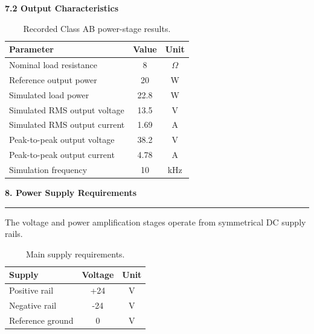 \documentclass[10pt,letterpaper]{article}
\newcommand{\datasheetsection}[1]{
    \vspace{0.3cm}
    {\large\bfseries\color{datasheetblue}#1}
    \par\vspace{0.1cm}
    \hrule
    \vspace{0.15cm}
}
\newcommand{\datasheetsubsection}[1]{
    \vspace{0.15cm}
    {\normalsize\bfseries\color{datasheetblue}#1}
    \par
}
\begin{document}
\datasheetsubsection{7.2 Output Characteristics}

\begin{table}[htbp]
\centering
\small

\begin{tabular}{p{7cm}cc}
\hline
Parameter & Value & Unit\\
\hline

Nominal load resistance & 8 & $\Omega$\\

Reference output power & 20 & W\\

Simulated load power & 22.8 & W\\

Simulated RMS output voltage & 13.5 & V\\

Simulated RMS output current & 1.69 & A\\

Peak-to-peak output voltage & 38.2 & V\\

Peak-to-peak output current & 4.78 & A\\

Simulation frequency & 10 & kHz\\

\hline
\end{tabular}

\caption{Recorded Class AB power-stage results.}
\end{table}

\datasheetsection{8. Power Supply Requirements}

The voltage and power amplification stages
operate from symmetrical DC supply rails.

\begin{table}[htbp]
\centering

\begin{tabular}{p{7cm}cc}
\hline
Supply & Voltage & Unit\\
\hline

Positive rail & +24 & V\\

Negative rail & -24 & V\\

Reference ground & 0 & V\\

\hline
\end{tabular}

\caption{Main supply requirements.}
\end{table}
\end{document}
